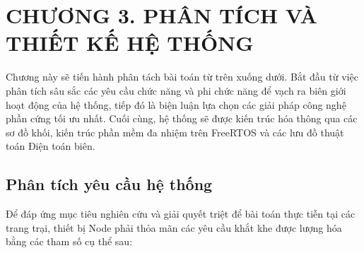 
\section*{CHƯƠNG 3. PHÂN TÍCH VÀ THIẾT KẾ HỆ THỐNG}
\setcounter{section}{3}
\setcounter{subsection}{0}
\setcounter{figure}{0}
\setcounter{table}{0}
Chương này sẽ tiến hành phân tách bài toán từ trên xuống dưới. Bắt đầu từ việc phân tích sâu sắc các yêu cầu chức năng và phi chức năng để vạch ra biên giới hoạt động của hệ thống, tiếp đó là biện luận lựa chọn các giải pháp công nghệ phần cứng tối ưu nhất. Cuối cùng, hệ thống sẽ được kiến trúc hóa thông qua các sơ đồ khối, kiến trúc phần mềm đa nhiệm trên FreeRTOS và các lưu đồ thuật toán Điện toán biên. 
\subsection{Phân tích yêu cầu hệ thống}
Để đáp ứng mục tiêu nghiên cứu và giải quyết triệt để bài toán thực tiễn tại các trang trại, thiết bị Node phải thỏa mãn các yêu cầu khắt khe được lượng hóa bằng các tham số cụ thể sau:
